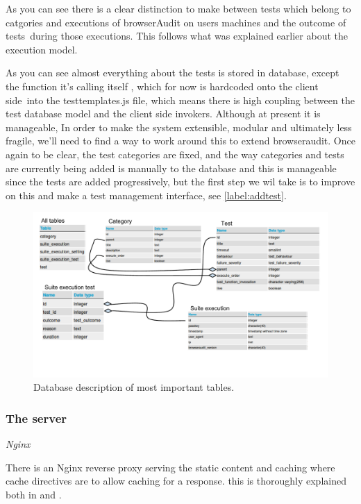 As you can see there is a clear distinction to make between tests which belong to catgories and executions of browserAudit on users machines and the outcome of tests\
during those executions. This follows what was explained earlier about the execution model. \

As you can see almost everything about the tests is stored in database, except the function it's calling itself , which for now is hardcoded onto the client side\
into the testtemplates.js file, which means there is high coupling between the test database model and the client side invokers. 
Although at present it is manageable, In order to make the system extensible, modular and ultimately less fragile, we'll need to find a way to work around this
to extend browseraudit.
Once again to be clear, the test categories are fixed, and the way categories and tests are currently being added is manually to the database 
and this is manageable since the tests are added progressively, but the first step we wil take is to improve on this and make a test management interface, see \ref{label:addtest}.


\begin{figure}
\centering
\includegraphics[width=1\textwidth]{db.pdf}
\caption{\label{fig:model}Database description of most important tables.}
\end{figure}


\subsubsection{The server}

\emph{Nginx}

There is an Nginx reverse proxy serving the static content and caching where cache directives are to allow caching for a response. this is thoroughly explained both in 
\cite{charlie} and \cite{maffeis}. 

